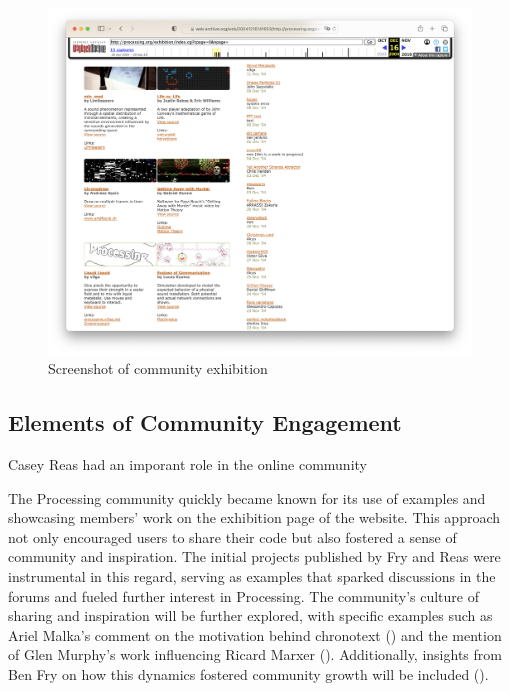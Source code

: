 %
%
%
%





\newpage
\begin{figure}
	\centering
	\includegraphics[width=1.0\textwidth]{images/exhibitions.png}
	\caption{Screenshot of community exhibition}
	\label{fig:website-exhibition}
\end{figure}

\subsection{Elements of Community Engagement}
Casey Reas had an imporant role in the online community

The Processing community quickly became known for its use of examples and showcasing members' work on the exhibition page of the website. This approach not only encouraged users to share their code but also fostered a sense of community and inspiration. The initial projects published by Fry and Reas were instrumental in this regard, serving as examples that sparked discussions in the forums and fueled further interest in Processing. The community's culture of sharing and inspiration will be further explored, with specific examples such as Ariel Malka's comment on the motivation behind chronotext () and the mention of Glen Murphy's work influencing Ricard Marxer (). Additionally, insights from Ben Fry on how this dynamics fostered community growth will be included ().

